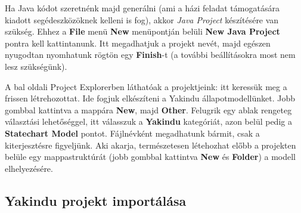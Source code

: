 Ha Java kódot szeretnénk majd generálni (ami a házi feladat támogatására kiadott segédeszközöknek kelleni is fog), akkor \emph{Java Project} készítésére van szükség. Ehhez a \textbf{File} menü \textbf{New} menüpontján belüli \textbf{New Java Project} pontra kell kattintanunk. Itt megadhatjuk a projekt nevét, majd egészen nyugodtan nyomhatunk rögtön egy \textbf{Finish}-t (a további beállításokra most nem lesz szükségünk).

\begin{comment}
a további beállításokra még Szoftlab 3-on sem lesz szükségünk.
\end{comment}

\begin{comment}
\subsection{A projekten belüli Yakindu-mappa létrehozása -->}
\end{comment}

\begin{comment}
A bal oldali Project Explorerben láthatóak a projektjeink: itt keressük meg a frissen létrehozottat. A projekten belül célszerű lesz egy külön mappát létrehozni a modell számára Erre jobb gombbal kattintva \textbf{New} és \textbf{Folder}. A létrehozandó mappának adjuk a \emph{model} nevet. Ez persze bármi lehet, de most a modell nevet adjuk a mappának, hiszen a benne tárolt adat egy Yakinduban létrehozott állapotmodell lesz. A projektünkön belül létrejött egy \codeEsc{model} nevű mappa.
\subsection{A Yakindu állapotmodell létrehozása}
\end{comment}

A bal oldali Project Explorerben láthatóak a projektjeink: itt keressük meg a frissen létrehozottat. Ide fogjuk elkészíteni a Yakindu állapotmodellünket. Jobb gombbal kattintva a mappára \textbf{New}, majd \textbf{Other}. Felugrik egy ablak rengeteg választási lehetőséggel, itt válasszuk a \textbf{Yakindu} kategóriát, azon belül pedig a \textbf{Statechart Model} pontot. Fájlnévként megadhatunk bármit, csak a  kiterjesztésre figyeljünk. Aki akarja, természetesen létehozhat előbb a projekten belüle egy mappastruktúrát (jobb gombbal kattintva \textbf{New} és \textbf{Folder}) a modell elhelyezésére.

\subsection{Yakindu projekt importálása}
\label{sec:yakindu-projekt-importalasa}

